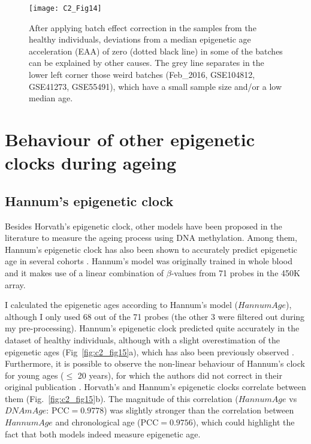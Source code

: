\begin{figure}[htbp!] 
	\centering
	\texttt{[image: C2\_Fig14]}
	\vspace*{2mm}    
	\caption[Causes of deviation from the expected EAA distribution in the control model]{After applying batch effect correction in the samples from the healthy individuals, deviations from a median epigenetic age acceleration (EAA) of zero (dotted black line) in some of the batches can be explained by other causes. The grey line separates in the lower left corner those weird batches (Feb\_2016, GSE104812, GSE41273, GSE55491), which have a small sample size and/or a low median age.}
	\label{fig:c2_fig14}
\end{figure}


\section{Behaviour of other epigenetic clocks during ageing}

\smallskip

\subsection{Hannum's epigenetic clock}

Besides Horvath's epigenetic clock, other models have been proposed in the literature to measure the ageing process using DNA methylation. Among them, Hannum's epigenetic clock has also been shown to accurately predict epigenetic age in several cohorts \cite{Horvath2016,Chen2016,Marioni2018,Marioni2015,Perna2016,Irvin2018}. Hannum's model was originally trained in whole blood and it makes use of a linear combination of $\beta$-values from 71 probes in the 450K array. 

\bigskip

I calculated the epigenetic ages according to Hannum's model ($HannumAge$), although I only used 68 out of the 71 probes (the other 3 were filtered out during my pre-processing). Hannum's epigenetic clock predicted quite accurately in the dataset of healthy individuals, although with a slight overestimation of the epigenetic ages (Fig~\ref{fig:c2_fig15}a), which has also been previously observed \cite{Marioni2015}. Furthermore, it is possible to observe the non-linear behaviour of Hannum's clock for young ages ($\leq$ 20 years), for which the authors did not correct in their original publication \cite{Hannum2013}. Horvath's and Hannum's epigenetic clocks correlate between them (Fig.~\ref{fig:c2_fig15}b). The magnitude of this correlation ($HannumAge$ vs $DNAmAge$: $\text{PCC} = 0.9778$) was slightly stronger than the correlation between $HannumAge$ and chronological age ($\text{PCC} = 0.9756$), which could highlight the fact that both models indeed  measure epigenetic age.

